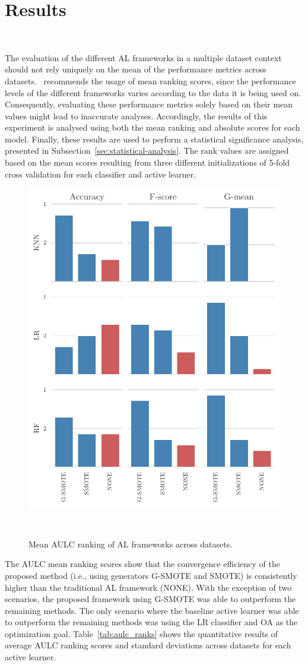 \documentclass[parskip=full]{scrartcl}
\begin{document}
\section{Results}~\label{sec:results}

The evaluation of the different AL frameworks in a multiple dataset context
should not rely uniquely on the mean of the performance metrics across
datasets.~\cite{demvsar2006} recommends the usage of mean ranking scores, since
the performance levels of the different frameworks varies according to the data
it is being used on. Consequently, evaluating these performance metrics solely
based on their mean values might lead to inaccurate analyses. Accordingly, the
results of this experiment is analysed using both the mean ranking and absolute
scores for each model. Finally, these results are used to perform a statistical
significance analysis, presented in Subsection~\ref{sec:statistical-analysis}.
The rank values are assigned based on the mean scores resulting from three
different initializations of 5-fold cross validation for each classifier and
active learner.

\begin{figure}[H]
	\centering
	\includegraphics[width=.6\linewidth]{../analysis/mean_rankings_bar_chart}
    \caption{Mean AULC ranking of AL frameworks across datasets.}~\label{fig:aulc_ranks}
\end{figure}

The AULC mean ranking scores show that the convergence efficiency of the
proposed method (i.e., using generators G-SMOTE and SMOTE) is consistently
higher than the traditional AL framework (NONE). With the exception of two
scenarios, the proposed framework using G-SMOTE was able to outperform the
remaining methods. The only scenario where the baseline active learner was able
to outperform the remaining methods was using the LR classifier and OA as the
optimization goal. Table~\ref{tab:aulc_ranks} shows the quantitative results of
average AULC ranking scores and standard deviations across datasets for each
active learner.
\end{document}
